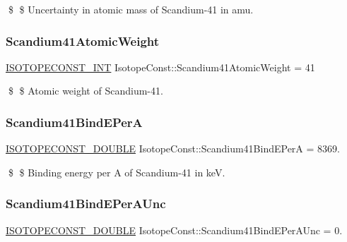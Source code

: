 \$ \$ Uncertainty in atomic mass of Scandium-\/41 in amu. \mbox{\label{group___isotope_const-_scandium-_sc41_gae5a693dec6c179f0f188d2216738c121}} 
\subsubsection{\texorpdfstring{Scandium41\+Atomic\+Weight}{Scandium41AtomicWeight}}
{\footnotesize\ttfamily \mbox{\hyperlink{group___isotope_const-_macros_ga5f18360b3e99483a35c32d789e62621c}{I\+S\+O\+T\+O\+P\+E\+C\+O\+N\+S\+T\+\_\+\+I\+NT}} Isotope\+Const\+::\+Scandium41\+Atomic\+Weight = 41}

\$ \$ Atomic weight of Scandium-\/41. \mbox{\label{group___isotope_const-_scandium-_sc41_gad129cdcd1fb42716dfb177eb37f0967f}} 
\subsubsection{\texorpdfstring{Scandium41\+Bind\+E\+PerA}{Scandium41BindEPerA}}
{\footnotesize\ttfamily \mbox{\hyperlink{group___isotope_const-_macros_ga8f45a7272ce02c0b4c65c44636ed719a}{I\+S\+O\+T\+O\+P\+E\+C\+O\+N\+S\+T\+\_\+\+D\+O\+U\+B\+LE}} Isotope\+Const\+::\+Scandium41\+Bind\+E\+PerA = 8369.}

\$ \$ Binding energy per A of Scandium-\/41 in keV. \mbox{\label{group___isotope_const-_scandium-_sc41_ga0be925449b8e148f578570f65784f280}} 
\subsubsection{\texorpdfstring{Scandium41\+Bind\+E\+Per\+A\+Unc}{Scandium41BindEPerAUnc}}
{\footnotesize\ttfamily \mbox{\hyperlink{group___isotope_const-_macros_ga8f45a7272ce02c0b4c65c44636ed719a}{I\+S\+O\+T\+O\+P\+E\+C\+O\+N\+S\+T\+\_\+\+D\+O\+U\+B\+LE}} Isotope\+Const\+::\+Scandium41\+Bind\+E\+Per\+A\+Unc = 0.}

